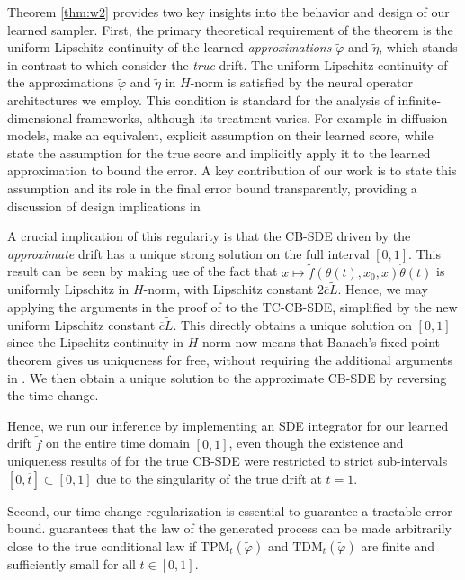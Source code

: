 Theorem \ref{thm:w2} provides two key insights into the behavior and design of our learned sampler. First, the primary theoretical requirement of the theorem is the uniform Lipschitz continuity of the  learned \textit{approximations} \(\widetilde{\varphi}\) and \(\widetilde{\eta}\), which stands in contrast to  which consider the \textit{true} drift. The uniform Lipschitz continuity of the approximations \(\widetilde{\varphi}\) and \(\widetilde{\eta}\) in \(H\)-norm is satisfied by the neural operator architectures we employ. This condition is standard for the analysis of infinite-dimensional frameworks, although its treatment varies.  For example in diffusion models, \citet{hagemann2023multilevel} make an equivalent, explicit assumption on their learned score, while \citet[Theorem 14]{pidstrigach2023infinite} state the assumption for the true score and implicitly apply it to the learned approximation to bound the error. A key contribution of our work is to state this assumption and its role in the final error bound transparently, providing a discussion of design implications in 

A crucial implication of this regularity is that the CB-SDE driven by the \textit{approximate} drift has a unique strong solution on the full interval \([0, 1]\). This result can be seen by making use of the fact that  \(x \mapsto \widetilde{f}(\theta(t), x_{0}, x)\dot{\theta}(t)\) is uniformly Lipschitz in \(H\)-norm, with Lipschitz constant \(2 \overline{c} \widetilde{L}\). Hence, we may applying the  arguments in the proof of  to the TC-CB-SDE, simplified by the new uniform Lipschitz constant \(\overline{c} \widetilde{L}\). This directly obtains a unique solution on \([0, 1]\) since the Lipschitz continuity in \(H\)-norm now means that Banach's fixed point theorem gives us uniqueness for free, without requiring the additional arguments in . We then obtain a unique solution to the approximate CB-SDE by reversing the time change. %

Hence, we run our inference by implementing an SDE integrator for our learned drift \(\widetilde{f}\) on the entire time domain \([0, 1]\), even though the existence and uniqueness results of  for the true CB-SDE were restricted to strict sub-intervals \([0, \overline{t}] \subset [0, 1]\) due to the singularity of the true drift at \(t = 1\).

Second, our time-change regularization is essential to guarantee a tractable error bound.  guarantees that the law of the generated process can be made arbitrarily close to the true conditional law if \(\mathrm{TPM}_{t}(\widetilde{\varphi})\) and \(\mathrm{TDM}_{t}(\widetilde{\varphi})\) are finite and sufficiently small for all \(t \in [0, 1]\).


